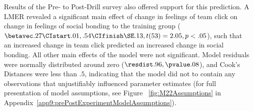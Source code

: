 



Results of the Pre- to Post-Drill survey also offered support for this prediction.  A LMER revealed a significant main effect of change in feelings of team click on change in feelings of social bonding to the training group ($\betavec .27 \CIstart .01, .54 \CIfinish \SE .13, t(53) = 2.05, p < .05$), such that an increased change in team click predicted an increased change in social bonding.  All other main effects of the model were not significant. Model residuals were normally distributed around zero ($\resdist .96, \pvalue .08$), and Cook's Distances were less than $.5$, indicating that the model did not to contain any observations that unjustifiably influenced parameter estimates (for full presentation of model assumptions, see Figure ~\ref{fig:M22Assumptions} in Appendix~\ref{app9:prePostExperimentModelAssumptions}).









